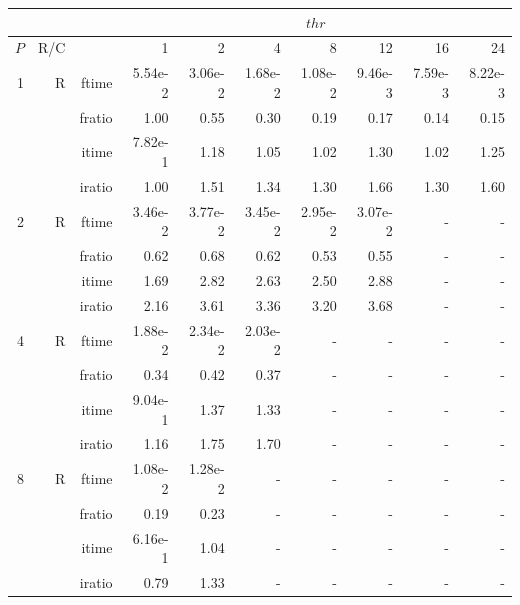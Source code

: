 \documentclass[a4paper]{article}
\begin{document}
\begin{table}[htbp]
\begin{center}
\begin{small}
\begin{tabular}{|r|r|r|r|r|r|r|r|r|r|}
\hline 
     & & & \multicolumn{7}{c|}{$thr$} \\ \hline
    $P$ & R/C &  & 1           & 2    & 4    & 8    & 12   & 16    & 24  \\ \hline\hline
      1  &   R &   ftime &   5.54e-2 &    3.06e-2 &    1.68e-2 &    1.08e-2 &    9.46e-3 &    7.59e-3 &    8.22e-3 \\
           &            &  fratio &    1.00 &    0.55 &    0.30 &    0.19 &    0.17 &    0.14 &    0.15 \\
           &            &  itime &   7.82e-1 &    1.18  &    1.05  &    1.02  &    1.30  &    1.02  &    1.25  \\
           &            &  iratio &    1.00 &    1.51 &    1.34 &    1.30 &    1.66 &    1.30 &    1.60  \\\hline
   2  &   R &   ftime &   3.46e-2 &    3.77e-2 &    3.45e-2 &    2.95e-2 &    3.07e-2 &   - &   - \\
           &            &  fratio &   0.62 &    0.68 &    0.62 &    0.53 &    0.55 &   - &   - \\
           &            &  itime &   1.69  &    2.82  &    2.63  &    2.50  &    2.88  &   - &   - \\
           &            &  iratio &   2.16 &    3.61 &    3.36 &    3.20 &    3.68 &   - &   - \\\hline
   4  &   R &   ftime &   1.88e-2 &    2.34e-2 &    2.03e-2 &   - &   - &   - &   - \\
           &            &  fratio &   0.34 &    0.42 &    0.37 &   - &   - &   - &   - \\
           &            &  itime &   9.04e-1 &    1.37  &    1.33  &   - &   - &   - &   - \\
           &            &  iratio &   1.16 &    1.75 &    1.70 &   - &   - &   - &   - \\\hline
   8  &   R &   ftime &   1.08e-2 &    1.28e-2 &   - &   - &   - &   - &   - \\
           &            &  fratio &   0.19 &    0.23 &   - &   - &   - &   - &   - \\
           &            &  itime &   6.16e-1 &    1.04  &   - &   - &   - &   - &   - \\
           &            &  iratio &   0.79 &    1.33 &   - &   - &   - &   - &   - \\\hline

\end{tabular}
\end{small}
\end{center}
\end{table}
\end{document}
